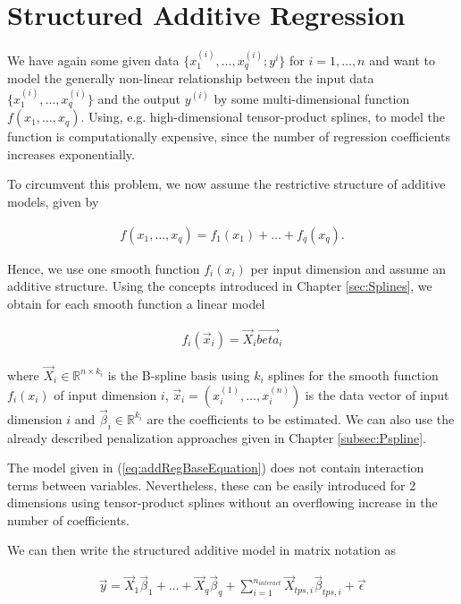 \documentclass[10pt,a4paper]{report}
\begin{document}
\section{Structured Additive Regression} \label{sec:STAR}

We have again some given data $\{x^{(i)}_{1}, \dots, x^{(i)}_{q}; y^i\}$ for $i = 1, \dots, n$ and want to model the generally non-linear relationship between the input data $\{x^{(i)}_{1}, \dots, x^{(i)}_{q}\}$ and the output $y^{(i)}$ by some multi-dimensional function $f(x_1, \dots, x_q)$.  Using, e.g. high-dimensional tensor-product splines, to model the function is computationally expensive, since the number of regression coefficients increases exponentially.

To circumvent this problem, we now assume the restrictive structure of additive models, given by

\begin{align} \label{eq:addRegBaseEquation}
	f(x_1, \dots, x_q) = f_1(x_1) + \dots + f_q(x_q).
\end{align}

Hence, we use one smooth function $f_i(x_i)$ per input dimension and assume an additive structure. \cite{fahrmeir2013regression} Using the concepts introduced in Chapter \ref{sec:Splines}, we obtain for each smooth function a linear model

\begin{align}
	f_i(\vec{x}_i) = \vec{X}_i \vec{beta}_i
\end{align}

where $\vec{X}_i \in \mathbb R^{n \times k_i}$ is the B-spline basis using $k_i$ splines for the smooth function $f_i(x_i)$ of input dimension $i$, $\vec{x}_i = (x_i^{(1)}, \dots, x_i^{(n)})$ is the data vector of input dimension $i$ and $\vec{\beta}_i \in \mathbb R^{k_i}$ are the coefficients to be estimated. We can also use the already described penalization approaches given in Chapter \ref{subsec:Pspline}. 

The model given in (\ref{eq:addRegBaseEquation}) does not contain interaction terms between variables. Nevertheless, these can be easily introduced for 2 dimensions using tensor-product splines without an overflowing increase in the number of coefficients.

We can then write the structured additive model in matrix notation as 

\begin{align} \label{eq:STAR}
	\vec{y} = \vec{X}_1 \vec{\beta}_1 + \dots + \vec{X}_q \vec{\beta}_q + \sum_{i=1}^{n_{interact}} \vec{X}_{tps, i} \vec{\beta}_{tps,i} + \vec{\epsilon}
\end{align}
\end{document}
